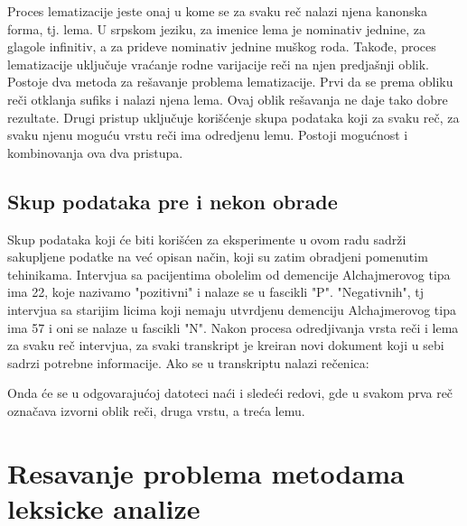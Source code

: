 \documentclass[12pt,oneside]{memoir}
\begin{document}
Proces lematizacije jeste onaj u kome se za svaku reč nalazi njena kanonska forma, tj. lema. U srpskom jeziku,  za imenice lema je nominativ jednine,  za glagole infinitiv,  a za prideve nominativ jednine muškog roda. Takođe,  proces lematizacije uključuje vraćanje rodne varijacije reči na njen predjašnji oblik. 
Postoje dva metoda za rešavanje problema lematizacije.  Prvi da se prema obliku reči otklanja sufiks i nalazi njena lema.  Ovaj oblik rešavanja ne daje tako dobre rezultate.  Drugi pristup uključuje korišćenje skupa podataka koji za svaku reč,  za svaku njenu moguću vrstu reči ima odredjenu lemu.  Postoji mogućnost i kombinovanja ova dva pristupa. 

\section{Skup podataka pre i nekon obrade}

Skup podataka koji će biti korišćen za eksperimente u ovom radu sadrži sakupljene podatke na već opisan način,  koji su zatim obradjeni pomenutim tehinikama.  Intervjua sa pacijentima obolelim od demencije Alchajmerovog tipa ima 22,  koje nazivamo "pozitivni" i nalaze se u fascikli "P".  "Negativnih",  tj intervjua sa starijim licima koji nemaju utvrdjenu demenciju Alchajmerovog tipa ima 57 i oni se nalaze u fascikli "N".  Nakon procesa odredjivanja vrsta reči i lema za svaku reč intervjua,  za svaki transkript je kreiran novi dokument koji u sebi sadrzi potrebne informacije.  Ako se u transkriptu nalazi rečenica:
\newline

\noindent{}
\newline\newline
Onda će se u odgovarajućoj datoteci naći i sledeći redovi, gde u svakom prva reč označava izvorni oblik reči, druga vrstu, a treća lemu. 
\newline

\noindent{}

\chapter{Resavanje problema metodama leksicke analize}
\end{document}
